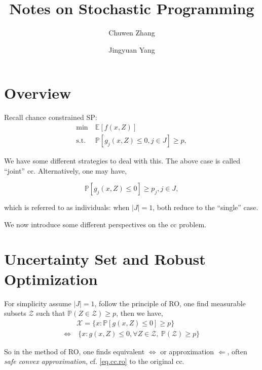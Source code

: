 \documentclass[a4pper,11pt]{article}
\title{Notes on Stochastic Programming}
\newcommand{\st}{\mathrm{s.t.\;}}
\newcommand{\pr}{\mathbb P}
\begin{document}
\author[1]{\small Chuwen Zhang}
\author[1]{\small Jingyuan Yang}
\maketitle

\section{Overview}

Recall chance constrained SP:
\begin{align}
    \min & ~ \mathbb{E}[f(x, Z)]                                       \\
    \st  & ~ \mathbb{P}\left[g_{j}(x, Z) \leq 0, j \in J\right] \ge p,
\end{align}

We have some different strategies to deal with this. The above case is called ``joint'' cc. Alternatively, one may have,

\[
    \mathbb{P}\left[g_{j}(x, Z) \leq 0 \right] \ge p_j, j \in J,
\]

which is referred to as individuals: when \(|J| = 1\), both reduce to the ``single'' case.

We now introduce some different perspectives on the cc problem.
\section{Uncertainty Set and Robust Optimization}
For simplicity assume \(|J| = 1\), follow the principle of RO, one find measurable subsets \(\mathcal Z\) such that \(\pr(Z\in \mathcal Z) \ge p\), then we have,
\begin{align}
                                       & \mathcal X = \{x: \mathbb{P}\left[g(x, Z) \leq 0\right] \ge p\}       \\
    \label{eq.cc.ro}   \Leftrightarrow & ~\{x: g(x, Z) \leq 0, \forall Z\in\mathcal Z, ~\pr(\mathcal Z)\ge p\}
\end{align}

So in the method of RO, one finds equivalent \(\Leftrightarrow\) or approximation \(\Leftarrow\), often \emph{safe convex approximation}, cf. \eqref{eq.cc.ro} to the original cc.
\end{document}
